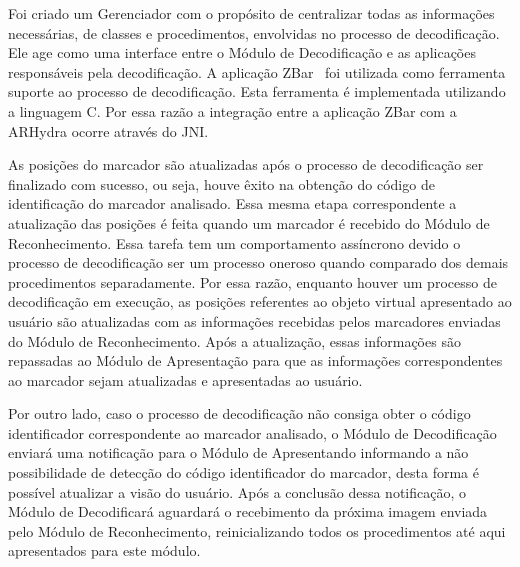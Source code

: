 	Foi criado um Gerenciador com o propósito de centralizar todas as informações necessárias, de classes e 
	procedimentos, envolvidas no processo de decodificação. Ele age como uma interface entre o Módulo de 
	Decodificação e as aplicações responsáveis pela decodificação. A aplicação ZBar~\cite{zbar} foi utilizada 
	como ferramenta suporte ao processo de decodificação. Esta ferramenta é implementada utilizando a linguagem C. 
	Por essa razão a integração entre a aplicação ZBar com a ARHydra ocorre através do JNI. 
	
	As posições do marcador são atualizadas após o processo de decodificação ser finalizado com sucesso, ou seja, 
	houve êxito na obtenção do código de identificação do marcador analisado. Essa mesma etapa correspondente a  
	atualização das posições é feita quando um marcador é recebido do Módulo de Reconhecimento. Essa tarefa tem 
	um comportamento assíncrono devido o processo de decodificação ser um processo oneroso quando comparado dos 
	demais procedimentos separadamente. Por essa razão, enquanto houver um processo de decodificação em execução, as 
	posições referentes ao objeto virtual apresentado ao usuário são atualizadas com as informações recebidas
	pelos marcadores enviadas do Módulo de Reconhecimento. Após a atualização, essas informações são repassadas 
	ao Módulo de Apresentação para que as informações correspondentes ao marcador sejam atualizadas e apresentadas 
	ao usuário.
	
	Por outro lado, caso o processo de decodificação não consiga obter o código identificador correspondente ao 
	marcador analisado, o Módulo de Decodificação enviará uma notificação para o Módulo de Apresentando informando 
	a não possibilidade de detecção do código identificador do marcador, desta forma é possível atualizar a visão
	do usuário. Após a conclusão dessa notificação, o Módulo de Decodificará aguardará o recebimento da próxima 
	imagem enviada pelo Módulo de Reconhecimento, reinicializando todos os procedimentos até aqui apresentados 
	para este módulo.
	
	